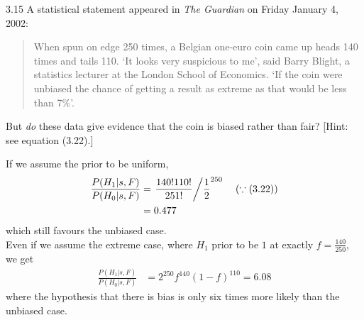 \documentclass[12pt, a4paper]{article}
\begin{document}
\begin{prob}{3.15}
    A statistical statement appeared in \textit{The Guardian} on Friday January 4, 2002:
\begin{quote}
    When spun on edge 250 times, a Belgian one-euro coin came up heads 140 times and tails 110. ‘It looks very suspicious to me’, said Barry Blight, a statistics lecturer at the London School of Economics. ‘If the coin were unbiased the chance of getting a result as extreme as that would be less than 7\%’.
\end{quote}
But \textit{do} these data give evidence that the coin is biased rather than fair? [Hint: see equation (3.22).]
\end{prob}
\begin{sol}
    If we assume the prior to be uniform,
    \begin{align*}
        \frac{P(H_1 | s, F)}{P(H_0 | s, F)} &= \left. \frac{140! 110!}{251!} \middle/ \frac{1}{2}^{250} \right. \quad (\because (3.22)) \\
        &= 0.477 \\
    \end{align*}
    which still favours the unbiased case. \\
    Even if we assume the extreme case, where $H_1$ prior to be $1$ at exactly $f = \frac{140}{250}$, we get 
    \begin{align*}
        \frac{P(H_1 | s, F)}{P(H_0 | s, F)} &= 2^{250} f^{140} (1-f)^{110} = 6.08
    \end{align*}
    where the hypothesis that there is bias is only six times more likely than the unbiased case.
\end{sol}
\bigskip


\end{document}
